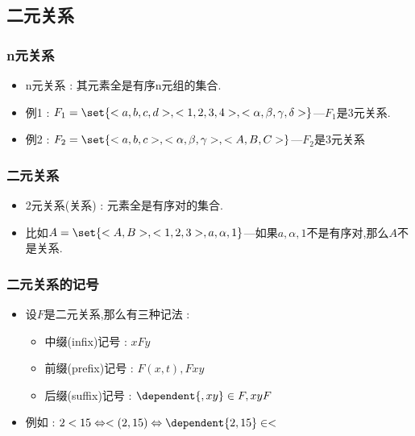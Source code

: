 {{{}%

\subsection{二元关系}{

  \subsubsection{n元关系}{
    \begin{itemize}
      \item n元关系 : 其元素全是有序n元组的集合.
      \item 例1 : $F_1 = \set{<a,b,c,d>,<1,2,3,4>,<\alpha,\beta,\gamma,\delta>}$---$F_1$是3元关系.
      \item 例2 : $F_2 = \set{<a,b,c>,<\alpha,\beta,\gamma>,<A,B,C>}$---$F_2$是3元关系
    \end{itemize}
  }%

  \subsubsection{二元关系}{
    \begin{itemize}
      \item 2元关系(关系) : 元素全是有序对的集合.
      \item 比如$A = \set{<A,B>,<1,2,3>,a,\alpha,1}$---如果$a,\alpha,1$不是有序对,那么$A$不是关系.
    \end{itemize}
  }%

  \subsubsection{二元关系的记号}{
    \begin{itemize}
      \item{
            设$F$是二元关系,那么有三种记法 :

            \begin{itemize}
              \item 中缀(infix)记号 : $xFy$
              \item 前缀(prefix)记号 : $F(x,t),Fxy$
              \item 后缀(suffix)记号 : $\dependent{,xy} \in F,xyF$
            \end{itemize}
            }
      \item 例如 : $2 < 15 \Leftrightarrow <(2,15) \Leftrightarrow \dependent{2,15} \in <$
    \end{itemize}
  }%

}}}
